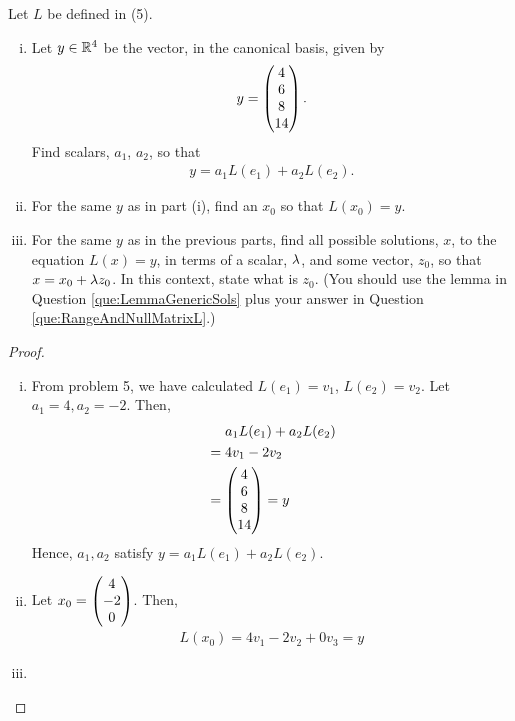 \begin{question}
	\normalfont
	Let $L$ be defined in (5).
	
	\begin{enumerate}[(i)]
		
		
		\item Let $y\in{\mathbb R}^4$ be the vector, in the canonical basis, given by
		\begin{align*}
			y=\begin{pmatrix} 4\\ 6\\8 \\ 14\end{pmatrix}.
		\end{align*}
		Find scalars, $a_1$, $a_2$, so that
		\begin{align*}
			y= a_1L(e_1) + a_2 L(e_2).
		\end{align*}
		 
		\item For the same $y$ as in part (i), find an $x_0$ so that $L(x_0)=y$.
		\item For the same $y$ as in the previous parts, find all possible solutions, $x$, to the equation $L(x)=y$, in terms of a scalar, $\lambda$, and some vector, $z_0$, so that $x=x_0+\lambda z_0$.  In this context, state what is $z_0$.  (You should use the lemma in Question \ref{que:LemmaGenericSols} plus your answer in Question \ref{que:RangeAndNullMatrixL}.)  
	
	\end{enumerate}
\end{question}
\begin{proof}
    \renewcommand{\qedsymbol}{$\blacksquare$}
    \begin{enumerate}[(i)]
        \item From problem 5, we have calculated $L(e_1)=v_1$, $L(e_2)=v_2$.
        Let $a_1=4, a_2=-2$. Then, 
        \[
            \begin{aligned}
                &\quad \ a_1L(e_1)+a_2L(e_2)\\
                &= 4v_1-2v_2\\
                &= \begin{pmatrix} 4\\ 6\\8 \\ 14\end{pmatrix}=y
            \end{aligned}
        \]
        Hence, $a_1,a_2$ satisfy $y=a_1L(e_1)+a_2L(e_2)$.
        \item Let $x_0=\begin{pmatrix} 4\\ -2\\ 0\end{pmatrix}$. Then, 
        \[
            \begin{aligned}
                L(x_0)=4v_1-2v_2+0v_3=y
            \end{aligned}
        \]
        \item 
    \end{enumerate}
    
    \renewcommand{\qedsymbol}{}
\end{proof}